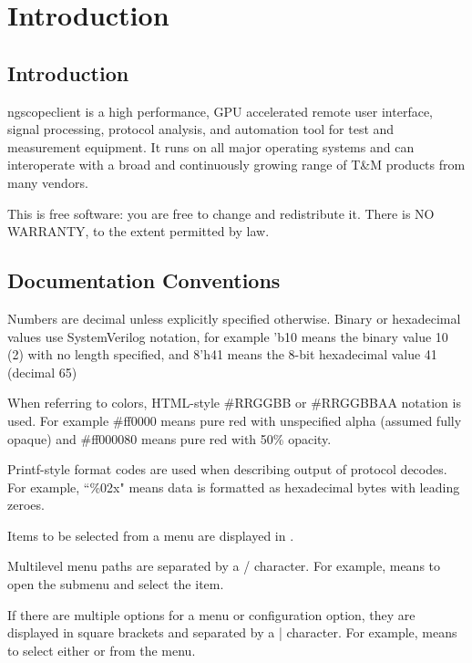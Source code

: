 \chapter{Introduction}

\section{Introduction}

ngscopeclient is a high performance, GPU accelerated remote user interface, signal processing, protocol analysis, and
automation tool for test and measurement equipment. It runs on all major operating systems and can interoperate with a
broad and continuously growing range of T\&M products from many vendors.

This is free software: you are free to change and redistribute it.
There is NO WARRANTY, to the extent permitted by law.

\section{Documentation Conventions}

Numbers are decimal unless explicitly specified otherwise. Binary or hexadecimal values use SystemVerilog notation, for
example 'b10 means the binary value 10 (2) with no length specified, and 8'h41 means the 8-bit hexadecimal value 41
(decimal 65)

When referring to colors, HTML-style \#RRGGBB or \#RRGGBBAA notation is used. For example \#ff0000 means pure red with
unspecified alpha (assumed fully opaque) and \#ff000080 means pure red with 50\% opacity.

Printf-style format codes are used when describing output of protocol decodes. For example, ``\%02x" means data is
formatted as hexadecimal bytes with leading zeroes.

Items to be selected from a menu are displayed in .

Multilevel menu paths are separated by a / character. For example,  means to open the
 submenu and select the  item.

If there are multiple options for a menu or configuration option, they are displayed in square brackets and separated
by a | character. For example,  means to select either
 or  from the 
menu.

